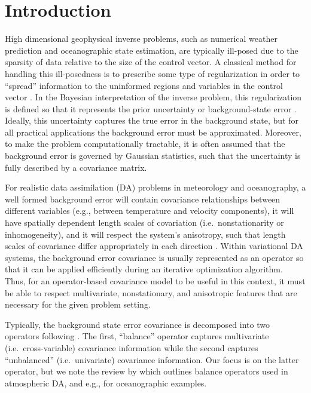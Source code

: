 \documentclass[alpha-refs]{wiley-article}
\begin{document}
\linenumbers


\section{Introduction}
\label{sec:intro}

High dimensional geophysical inverse problems,
such as numerical weather prediction and
oceanographic state estimation, are typically ill-posed due to the
sparsity of data relative to the size of the control vector.
A classical method for handling this ill-posedness is to prescribe
some type of regularization in order to ``spread'' information to the uninformed
regions and variables in the control vector \citep[e.g.,][]{wunsch_discrete_2006}.
In the Bayesian interpretation of the inverse problem, this regularization
is defined so that it represents the prior uncertainty or background-state error
\citep[e.g.,][]{bui-thanh_computational_2013}.
Ideally, this uncertainty captures the true error in the background state, but
for all practical applications the background error must be
approximated.
Moreover, to make the problem computationally tractable, it is often assumed
that the background error is governed by Gaussian statistics, such that the
uncertainty is fully described by a covariance matrix.

For realistic data assimilation (DA) problems in meteorology and
oceanography, a well formed background error will contain covariance relationships between
different variables (e.g., between temperature and velocity components),
it will have spatially dependent length scales of covariation
(i.e.\ nonstationarity or inhomogeneity),
and it will respect the system's anisotropy, such that length scales of covariance differ
appropriately in each direction \citep[e.g.,][]{bannister_review_2008-1}.
Within variational DA systems, the background error covariance is
usually represented as an operator so that it can be applied efficiently during
an iterative optimization algorithm.
Thus, for an operator-based covariance model to be useful in this context, it must be
able to respect multivariate, nonstationary, and anisotropic features that are
necessary for the given problem setting.

Typically, the background state error covariance is decomposed into two
operators following \citet{derber_reformulation_1999}.
The first, ``balance'' operator captures multivariate (i.e.\ cross-variable)
covariance information while the second captures ``unbalanced'' (i.e.\
univariate) covariance information.
Our focus is on the latter operator, but we note the review by
\citet{bannister_review_2008-2} which outlines balance operators used in
atmospheric DA, and e.g., \citet{weaver_multivariate_2005,moore_regional_2011-1} for oceanographic
examples.
\end{document}
